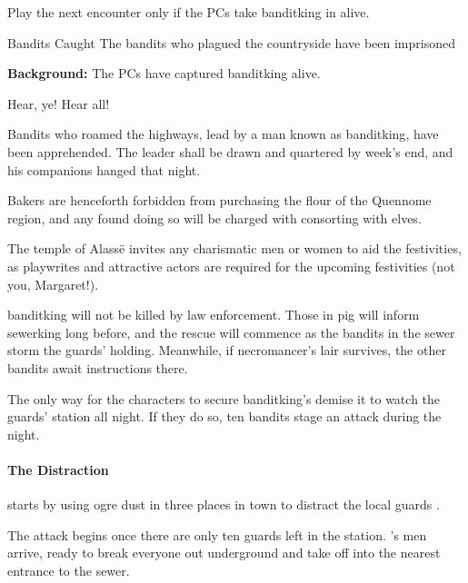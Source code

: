 \banditking



Play the next encounter only if the PCs take \gls{banditking} in alive.

\resumecontents[Town]

{Bandits Caught}%
{The bandits who plagued the countryside have been imprisoned}%

\stopcontents[Town]

\textbf{Background:}
The PCs have captured \gls{banditking} alive.

\begin{boxtext}

  Hear, ye!  Hear all!

  Bandits who roamed the highways, lead by a man known as \gls{banditking}, have been apprehended.  The leader shall be drawn and quartered by week's end, and his companions hanged that night.

  Bakers are henceforth forbidden from purchasing the flour of the Quennome region, and any found doing so will be charged with consorting with elves.

  The temple of Alass\"e invites any charismatic men or women to aid the festivities, as playwrites and attractive actors are required for the upcoming festivities (not you, Margaret!).

\end{boxtext}

\Gls{banditking} will not be killed by law enforcement.
Those in \gls{pig} will inform \gls{sewerking} long before, and the rescue will commence as the bandits in the sewer storm the guards' holding.
Meanwhile, if \gls{necromancer}'s lair survives, the other bandits await instructions there.


The only way for the characters to secure \gls{banditking}'s demise it to watch the guards' station all night.
If they do so, ten bandits stage an attack during the night.

\paragraph{The Distraction} starts by using ogre dust in three places in town to distract the local guards%
\iftoggle{aif}{(see \textit{Fenestra}, \autopageref{ogredust} for Ogre Dust)}{}.

The attack begins once there are only ten guards left in the station.
's men arrive, ready to break everyone out underground and take off into the nearest entrance to the sewer.

\stopcontents[sq]


